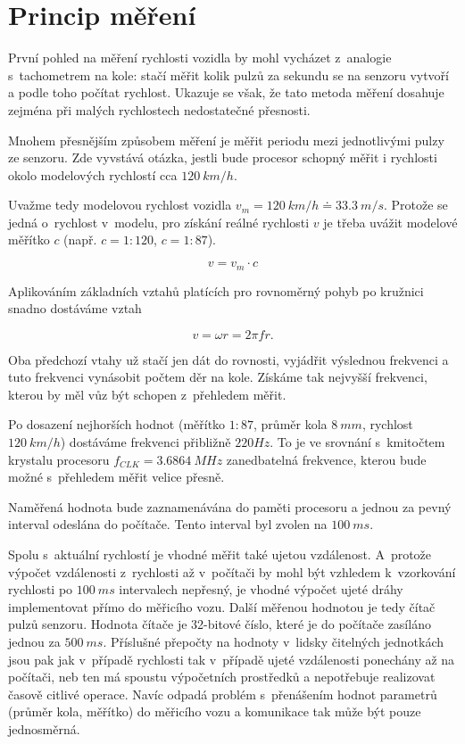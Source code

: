 \section{Princip měření}
\label{sec:wsm-mer-princip}

První pohled na měření rychlosti vozidla by mohl vycházet z~analogie
s~tachometrem na kole: stačí měřit kolik pulzů za sekundu se na senzoru vytvoří
a podle toho počítat rychlost. Ukazuje se však, že tato metoda měření dosahuje
zejména při malých rychlostech nedostatečné přesnosti.

Mnohem přesnějším způsobem měření je měřit periodu mezi jednotlivými pulzy ze
senzoru. Zde vyvstává otázka, jestli bude procesor schopný měřit i rychlosti
okolo modelových rychlostí cca $120\ km/h$.

Uvažme tedy modelovou rychlost vozidla $v_m = 120\ km/h \doteq 33.3\ m/s$.
Protože se jedná o~rychlost v~modelu, pro získání reálné rychlosti $v$ je třeba
uvážit modelové měřítko $c$ (např. $c = 1:120$, $c = 1:87$).

$$v = v_m \cdot c$$

Aplikováním základních vztahů platících pro rovnoměrný pohyb po kružnici snadno
dostáváme vztah

$$v = \omega r = 2 \pi f r.$$

Oba předchozí vtahy už stačí jen dát do rovnosti, vyjádřit výslednou frekvenci
a tuto frekvenci vynásobit počtem děr na kole. Získáme tak nejvyšší frekvenci,
kterou by měl vůz být schopen z~přehledem měřit.

Po dosazení nejhorších hodnot (měřítko $1:87$, průměr kola $8\ mm$, rychlost
$120\ km/h$) dostáváme frekvenci přibližně $220 Hz$. To je ve srovnání
s~kmitočtem krystalu procesoru $f_{CLK} = 3.6864\ MHz$ zanedbatelná frekvence,
kterou bude možné s~přehledem měřit velice přesně.

Naměřená hodnota bude zaznamenávána do paměti procesoru a jednou za pevný
interval odeslána do počítače. Tento interval byl zvolen na $100\ ms$.

Spolu s~aktuální rychlostí je vhodné měřit také ujetou vzdálenost. A~protože
výpočet vzdálenosti z~rychlosti až v~počítači by mohl být vzhledem k~vzorkování
rychlosti po $100\ ms$ intervalech nepřesný, je vhodné výpočet ujeté dráhy
implementovat přímo do měřicího vozu. Další měřenou hodnotou je tedy čítač
pulzů senzoru. Hodnota čítače je 32-bitové číslo, které je do počítače zasíláno
jednou za $500\ ms$. Příslušné přepočty na hodnoty v~lidsky čitelných
jednotkách jsou pak jak v~případě rychlosti tak v~případě ujeté vzdálenosti
ponechány až na počítači, neb ten má spoustu výpočetních prostředků a
nepotřebuje realizovat časově citlivé operace. Navíc odpadá problém
s~přenášením hodnot parametrů (průměr kola, měřítko) do měřicího vozu a
komunikace tak může být pouze jednosměrná.

